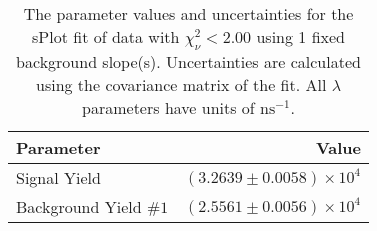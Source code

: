 
\begin{table}
    \begin{center}
        \begin{tabular}{lr}\toprule
            Parameter & Value \\\midrule
            Signal Yield & $(3.2639 \pm 0.0058) \times 10^{4}$ \\
            Background Yield $\#1$ & $(2.5561 \pm 0.0056) \times 10^{4}$ \\\bottomrule
        \end{tabular}
        \caption{The parameter values and uncertainties for the sPlot fit of data with $\chi^2_\nu < 2.00$ using 1 fixed background slope(s). Uncertainties are calculated using the covariance matrix of the fit. All $\lambda$ parameters have units of $\si{\nano\second}^{-1}$.}
    \end{center}
\end{table}
